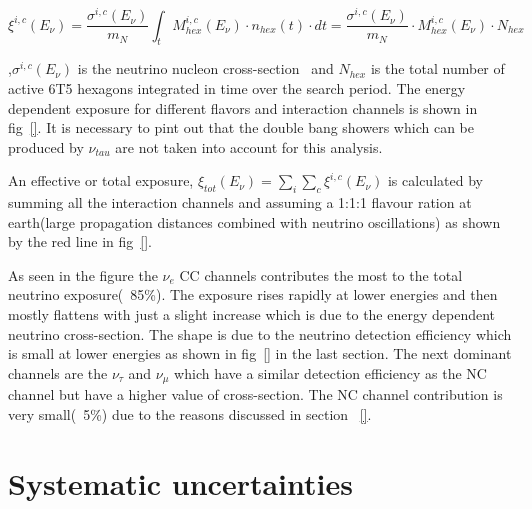 \begin{equation}
  \xi^{i,c}(E_{\nu}) = \frac{\sigma^{i,c}(E_{\nu})}{m_N} \int_{t} M_{hex}^{i,c}(E_{\nu}) \cdot n_{hex}(t) \cdot dt =  \frac{\sigma^{i,c}(E_{\nu})}{m_N} \cdot M_{hex}^{i,c}(E_{\nu}) \cdot N_{hex}
\end{equation}

,$\sigma^{i,c}(E_{\nu})$ is the neutrino nucleon cross-section~\cite{} and $N_{hex}$ is the total number of active 6T5 hexagons integrated in time over the search period. The energy dependent exposure for different flavors and interaction channels is shown in fig~\ref{}. It is necessary to pint out that the double bang showers which can be produced by $\nu_{tau}$ are not taken into account for this analysis. 

An effective or total exposure, $\xi_{tot}(E_{\nu}) = \sum_{i}\sum_{c} \xi^{i,c}(E_{\nu})$ is calculated by summing all the interaction channels and assuming a 1:1:1 flavour ration at earth(large propagation distances combined with neutrino oscillations) as shown by the red line in fig~\ref{}. 

As seen in the figure the $\nu_e$ CC channels contributes the most to the total neutrino exposure(~85\%). The exposure rises rapidly at lower energies and then mostly flattens with just a slight increase which is due to the energy dependent neutrino cross-section. The shape is due to the neutrino detection efficiency which is small at lower energies as shown in fig~\ref{} in the last section. The next dominant channels are the $\nu_{\tau}$ and $\nu_{\mu}$ which have a similar detection efficiency as the NC channel but have a higher value of cross-section. The NC channel contribution is very small(~5\%) due to the reasons discussed in section ~\ref{}.  

\section{Systematic uncertainties}
\label{sec:det_uncert}


